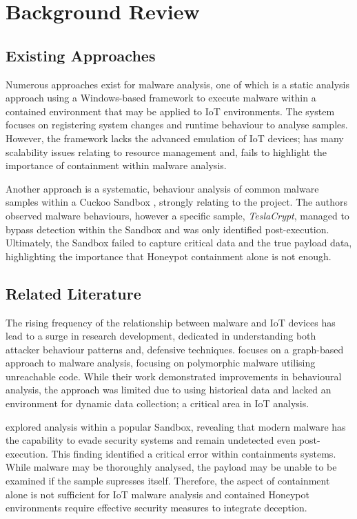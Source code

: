 \documentclass[a4paper,12pt,oneside]{book}			%
\begin{document}
\chapter{Background Review}\label{ch:backgroundReview}

\section{Existing Approaches}\label{sec:existingApproaches}

Numerous approaches exist for malware analysis, one of which is a static analysis approach using a Windows-based framework to execute malware \textit{\citep{static-analysis-drawbacks}} within a contained environment that may be applied to IoT environments. The system focuses on registering system changes and runtime behaviour to analyse samples. However, the framework lacks the advanced emulation of IoT devices; has many scalability issues relating to resource management and, fails to highlight the importance of containment within malware analysis.


Another approach is a systematic, behaviour analysis of common malware samples within a Cuckoo Sandbox \textit{\citep{analysis-mitigation-sandbox-evasion}}, strongly relating to the project. The authors observed malware behaviours, however a specific sample, \textit{TeslaCrypt}, managed to bypass detection within the Sandbox and was only identified post-execution. Ultimately, the Sandbox failed to capture critical data and the true payload data, highlighting the importance that Honeypot containment alone is not enough.


\section{Related Literature}\label{sec:relatedLiterature}

The rising frequency of the relationship between malware and IoT devices has lead to a surge in research development, dedicated in understanding both attacker behaviour patterns and, defensive techniques. \textit{\citep{cornell-malware-analysis}} focuses on a graph-based approach to malware analysis, focusing on polymorphic malware utilising unreachable code. While their work demonstrated improvements in behavioural analysis, the approach was limited due to using historical data and lacked an environment for dynamic data collection; a critical area in IoT analysis.

\textit{\citep{analysis-mitigation-sandbox-evasion}} explored analysis within a popular Sandbox, revealing that modern malware has the capability to evade security systems and remain undetected even post-execution. This finding identified a critical error within containments systems. While malware may  be thoroughly analysed, the payload may be unable to be examined if the sample supresses itself. Therefore, the aspect of containment alone is not sufficient for IoT malware analysis and contained Honeypot environments require effective security measures to integrate deception.
\end{document}
